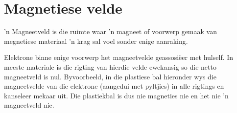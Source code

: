 


\section*{Magnetiese velde}


'n Magneetveld is die ruimte waar 'n magneet of voorwerp gemaak van megnetiese materiaal 'n krag sal voel sonder enige aanraking. \par

Elektrone binne enige voorwerp het magneetvelde geassosi\"eer met hulself. In meeste materiale is die rigting van hierdie velde ewekansig so die netto magneetveld is nul. Byvoorbeeld, in die plastiese bal hieronder wys die magneetvelde van die elektrone (aangedui met pyltjies) in alle rigtings en kanseleer mekaar uit. Die plastiekbal is dus nie magneties nie en het nie 'n magneetveld nie.

